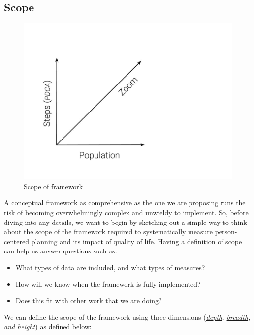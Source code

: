 \documentclass[
]{book}
\providecommand{\tightlist}{%
  \setlength{\itemsep}{0pt}\setlength{\parskip}{0pt}}
\begin{document}
\hypertarget{scope}{%
\subsection{Scope}\label{scope}}

\begin{figure}
\includegraphics[width=24in]{_bookdown_files/img/QoL Framework Scope} \caption{Scope of framework}\label{fig:unnamed-chunk-14}
\end{figure}

A conceptual framework as comprehensive as the one we are proposing runs the risk of becoming overwhelmingly complex and unwieldy to implement. So, before diving into any details, we want to begin by sketching out a simple way to think about the scope of the framework required to systematically measure person-centered planning and its impact of quality of life. Having a definition of scope can help us answer questions such as:

\begin{itemize}
\tightlist
\item
  What types of data are included, and what types of measures?\\
\item
  How will we know when the framework is fully implemented?\\
\item
  Does this fit with other work that we are doing?
\end{itemize}

We can define the scope of the framework using three-dimensions (\emph{\protect\hyperlink{zoom}{depth}, \protect\hyperlink{pop}{breadth}, and \protect\hyperlink{steps}{height}}) as defined below:
\end{document}
